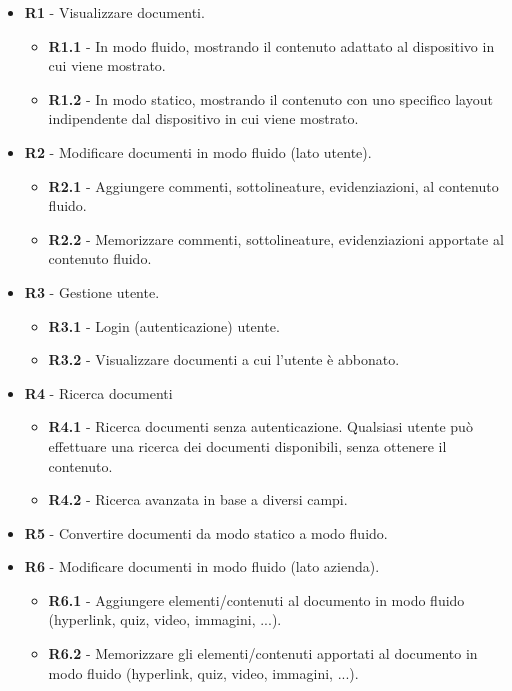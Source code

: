 \begin{itemize}
    \item \textbf{R1} - Visualizzare documenti.
    \begin{itemize}
        \item \textbf{R1.1} - In modo fluido, mostrando il contenuto adattato al dispositivo in cui viene mostrato.
        \item \textbf{R1.2} - In modo statico, mostrando il contenuto con uno specifico layout indipendente dal dispositivo in cui viene mostrato.
    \end{itemize}
    \item \textbf{R2} - Modificare documenti in modo fluido (lato utente).
    \begin{itemize}
        \item \textbf{R2.1} - Aggiungere commenti, sottolineature, evidenziazioni, al contenuto fluido.
        \item \textbf{R2.2} - Memorizzare commenti, sottolineature, evidenziazioni apportate al contenuto fluido.
    \end{itemize}
    \item \textbf{R3} - Gestione utente.
    \begin{itemize}
        \item \textbf{R3.1} - Login (autenticazione) utente.
        \item \textbf{R3.2} - Visualizzare documenti a cui l'utente è abbonato.
    \end{itemize}
    \item \textbf{R4} - Ricerca documenti
    \begin{itemize}
        \item \textbf{R4.1} - Ricerca documenti senza autenticazione. Qualsiasi utente può effettuare una ricerca dei documenti disponibili, senza ottenere il contenuto.
        \item \textbf{R4.2} - Ricerca avanzata in base a diversi campi. %
    \end{itemize}
    \item \textbf{R5} - Convertire documenti da modo statico a modo fluido.
    \item \textbf{R6} - Modificare documenti in modo fluido (lato azienda).
    \begin{itemize}
        \item \textbf{R6.1} - Aggiungere elementi/contenuti al documento in modo fluido (hyperlink, quiz, video, immagini, ...). %
        \item \textbf{R6.2} - Memorizzare gli elementi/contenuti apportati al documento in modo fluido (hyperlink, quiz, video, immagini, ...).
    \end{itemize}
\end{itemize}


